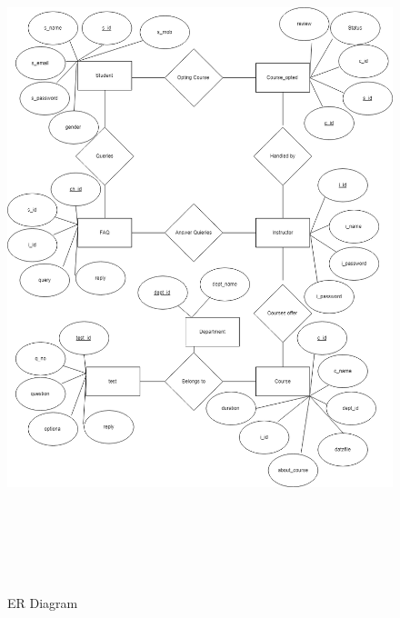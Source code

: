 \begin{figure}[!h]
	\begin{center}
		\includegraphics[height=20cm]{ERdiagram.png}
	\end{center}
\caption{ER Diagram}
\end{figure}
%
%
